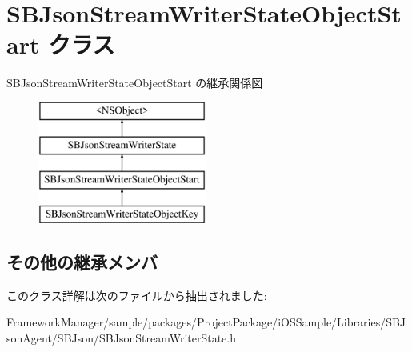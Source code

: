 \hypertarget{interface_s_b_json_stream_writer_state_object_start}{}\section{S\+B\+Json\+Stream\+Writer\+State\+Object\+Start クラス}
\label{interface_s_b_json_stream_writer_state_object_start}
S\+B\+Json\+Stream\+Writer\+State\+Object\+Start の継承関係図\begin{figure}[H]
\begin{center}
\leavevmode
\includegraphics[height=4.000000cm]{interface_s_b_json_stream_writer_state_object_start}
\end{center}
\end{figure}
\subsection*{その他の継承メンバ}


このクラス詳解は次のファイルから抽出されました\+:\begin{DoxyCompactItemize}
\item 
Framework\+Manager/sample/packages/\+Project\+Package/i\+O\+S\+Sample/\+Libraries/\+S\+B\+Json\+Agent/\+S\+B\+Json/S\+B\+Json\+Stream\+Writer\+State.\+h\end{DoxyCompactItemize}

